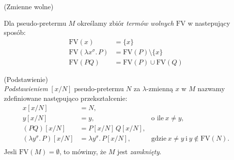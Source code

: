 \begin{definicja}(Zmienne wolne)
  \item Dla pseudo-pretermu \(M\) określamy zbiór \emph{termów wolnych} \(\mathrm{FV}\) w nastepujący sposób:
    \begin{align*}
      \mathrm{FV}(x) &= \{x\}\\
      \mathrm{FV}(\lambda x^\sigma .\, P)  &= \mathrm{FV}(P)\setminus\{x\}\\
      \mathrm{FV}(P Q) &= \mathrm{FV}(P)\cup\mathrm{FV}(Q)
    \end{align*}
\end{definicja}
\begin{definicja}(Podstawienie)\\
\emph{Podstawieniem} \([x/N]\) pseudo-pretermu \(N\) za \(\lambda\)-zmienną \(x\) w \(M\) nazwamy zdefiniowane następująco przekształcenie:
  \begin{align*}
    x[x/N] &= N,\\
    y[x/N] &= y,\ &\text{o ile}\ x\neq y,\\
    (PQ)[x/N] &= P[x/N]\,Q[x/N],\\
    (\lambda y^\sigma.\, P)[x/N] &= \lambda y^\sigma .\,P[x/N],\ &\text{gdzie}\ x\neq y\ \text{i}\ y\not\in \mathrm{FV}(N).\\
  \end{align*}
    Jesli \(\mathrm{FV}(M)=\emptyset\), to mówimy, że \(M\) jest \emph{zamknięty}. 
\end{definicja}


